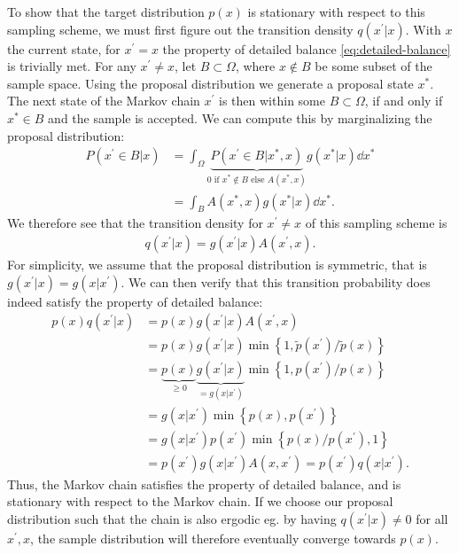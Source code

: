 To show that the target distribution $p(x)$ is stationary with respect to this sampling scheme, we must first figure out the transition density $q(x^\prime|x)$. 
With $x$ the current state, for $x^\prime=x$ the property of detailed balance \cref{eq:detailed-balance} is trivially met.
For any $x^\prime \neq x$, let $B\subset \Omega$, where $x\not\in B$ be some subset of the sample space. 
Using the proposal distribution we generate a proposal state $x^\ast$.
The next state of the Markov chain $x^\prime$ is then within some $B \subset \Omega$, if and only if $x^\ast \in B$ and the sample is accepted.
We can compute this by marginalizing the proposal distribution:
\begin{align}
        P(x^\prime \in B | x ) 
        &= \int_\Omega \underbrace{P( x^\prime \in B | x^\ast,x)}_{\text{$0$ if $x^\ast \not \in B$ else $A(x^\ast, x)$}} g(x^\ast|x) \dd{x^\ast}\\
        &= \int_B A(x^\ast, x) g(x^\ast|x) \dd{x^\ast}.
\end{align}
We therefore see that the transition density for $x^\prime \neq x$ of this sampling scheme is
\begin{align}
    q(x^\prime|x) = g(x^\prime | x) A(x^\prime, x).
\end{align} 
For simplicity, we assume that the proposal distribution is symmetric, that is $g(x^\prime | x) = g(x | x^\prime)$.
We can then verify that this transition probability does indeed satisfy the property of detailed balance:
\begin{align}
    p(x)q(x^\prime|x) &= p(x)g(x^\prime | x) A(x^\prime, x) \\
    &= p(x)g(x^\prime | x) \min\left\{1,  \tilde{p}(x^\prime) / \tilde{p}(x)\right\} \\
    &= \underbrace{p(x)}_{\geq 0} \underbrace{g(x^\prime | x)}_{=g(x | x^\prime)} \min\left\{1,  p(x^\prime) / p(x)\right\} \\
    &= g(x | x^\prime) \min\left\{p(x), p(x^\prime)\right\} \\
    &= g(x | x^\prime) p(x^\prime) \min\left\{p(x)/p(x^\prime), 1\right\} \\
    &= p(x^\prime) g(x | x^\prime)  A(x ,x^\prime) = p(x^\prime) q(x|x^\prime).
\end{align}
Thus, the Markov chain satisfies the property of detailed balance, and is stationary with respect to the Markov chain.
If we choose our proposal distribution such that the chain is also ergodic eg. by having $q(x^\prime|x) \neq 0$ for all $x^\prime,x$, the sample distribution will therefore eventually converge towards $p(x)$. 

